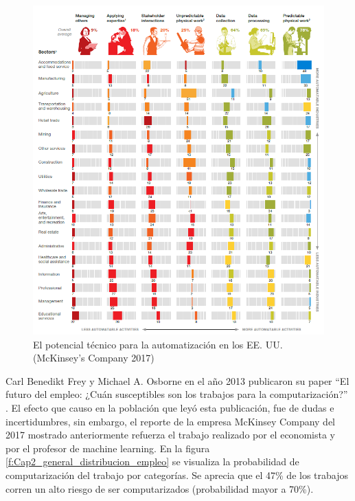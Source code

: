     \begin{figure}[h]
        \centering
        \includegraphics[width=0.97\linewidth]{Main/Chapter2/Images2/potencial-automatisacion.png}
        \caption{El potencial técnico para la automatización en los EE. UU. (McKinsey’s Company 2017) \cite{mckinsey_jobs}}
        \label{f:Cap2_general_potencial_automatizacion}
    \end{figure}
  
      \newpage
  
    Carl Benedikt Frey y Michael A. Osborne en el año 2013 publicaron su paper ``El futuro del empleo: ¿Cuán susceptibles son los trabajos para la computarización?” \cite{FREY2017254}. El efecto que causo en la población que leyó esta publicación, fue de dudas e incertidumbres, sin embargo, el reporte de la empresa McKinsey Company del 2017 mostrado anteriormente refuerza el trabajo realizado por el economista y por el profesor de machine learning. En la figura \ref{f:Cap2_general_distribucion_empleo} se visualiza la probabilidad de computarización del trabajo por categorías. Se aprecia que el 47\% de los trabajos corren un alto riesgo de ser computarizados (probabilidad mayor a 70\%).
    

